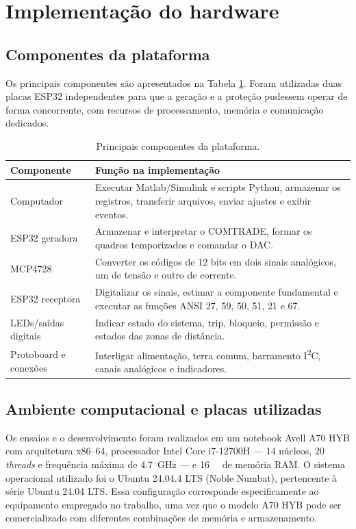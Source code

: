 \section{Implementação do hardware}

\subsection{Componentes da plataforma}

Os principais componentes são apresentados na Tabela \ref{tab:componentes-implementacao}. Foram utilizadas duas placas ESP32 independentes para que a geração e a proteção pudessem operar de forma concorrente, com recursos de processamento, memória e comunicação dedicados.

\begin{table}[H]
  \centering
  \small
  \caption{Principais componentes da plataforma.}
  \label{tab:componentes-implementacao}
  \begin{tabular}{p{3.4cm}p{9.4cm}}
    \toprule
    Componente & Função na implementação \\
    \midrule
    Computador & Executar Matlab/Simulink e scripts Python, armazenar os registros, transferir arquivos, enviar ajustes e exibir eventos. \\
    ESP32 geradora & Armazenar e interpretar o COMTRADE, formar os quadros temporizados e comandar o DAC. \\
    MCP4728 & Converter os códigos de 12 bits em dois sinais analógicos, um de tensão e outro de corrente. \\
    ESP32 receptora & Digitalizar os sinais, estimar a componente fundamental e executar as funções ANSI 27, 59, 50, 51, 21 e 67. \\
    LEDs/saídas digitais & Indicar estado do sistema, trip, bloqueio, permissão e estados das zonas de distância. \\
    Protoboard e conexões & Interligar alimentação, terra comum, barramento I\textsuperscript{2}C, canais analógicos e indicadores. \\
    \bottomrule
  \end{tabular}
\end{table}

\subsection{Ambiente computacional e placas utilizadas}

Os ensaios e o desenvolvimento foram realizados em um notebook Avell A70 HYB com arquitetura x86--64, processador Intel Core i7-12700H --- 14 núcleos, 20 \textit{threads} e frequência máxima de \SI{4,7}{\giga\hertz} \cite{intel_i7_12700h} --- e \SI{16}{\gibi\byte} de memória RAM. O sistema operacional utilizado foi o Ubuntu 24.04.4 LTS (Noble Numbat), pertencente à série Ubuntu 24.04 LTS. Essa configuração corresponde especificamente ao equipamento empregado no trabalho, uma vez que o modelo A70 HYB pode ser comercializado com diferentes combinações de memória e armazenamento.

